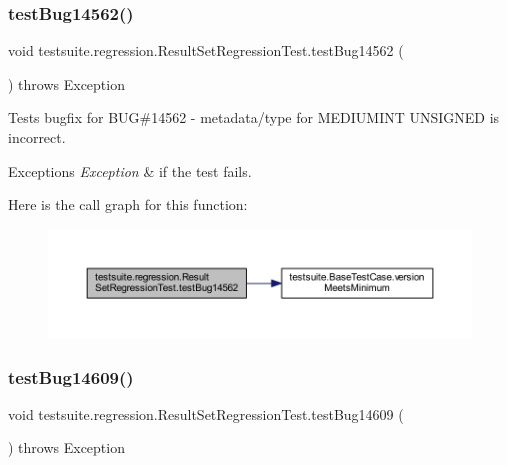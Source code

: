 \subsubsection{\texorpdfstring{test\+Bug14562()}{testBug14562()}}
{\footnotesize\ttfamily void testsuite.\+regression.\+Result\+Set\+Regression\+Test.\+test\+Bug14562 (\begin{DoxyParamCaption}{ }\end{DoxyParamCaption}) throws Exception}

Tests bugfix for B\+UG\#14562 -\/ metadata/type for M\+E\+D\+I\+U\+M\+I\+NT U\+N\+S\+I\+G\+N\+ED is incorrect.


\begin{DoxyExceptions}{Exceptions}
{\em Exception} & if the test fails. \\
\hline
\end{DoxyExceptions}
Here is the call graph for this function\+:
\nopagebreak
\begin{figure}[H]
\begin{center}
\leavevmode
\includegraphics[width=350pt]{classtestsuite_1_1regression_1_1_result_set_regression_test_ac1d2232b96f37d2f6ce4fbf52264cff8_cgraph}
\end{center}
\end{figure}
\mbox{\label{classtestsuite_1_1regression_1_1_result_set_regression_test_a7fc922fe83b42cb83638138be9f5ac4c}} 
\subsubsection{\texorpdfstring{test\+Bug14609()}{testBug14609()}}
{\footnotesize\ttfamily void testsuite.\+regression.\+Result\+Set\+Regression\+Test.\+test\+Bug14609 (\begin{DoxyParamCaption}{ }\end{DoxyParamCaption}) throws Exception}

